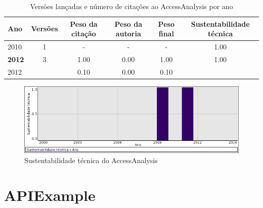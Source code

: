 \begin{table}[H]
\caption{Versões lançadas e número de citações ao AccessAnalysis por ano}
\centering
\begin{tabular}{| l | c | c | c | c | c |}
  \hline
  Ano & Versões & Peso da citação & Peso da autoria & Peso final & Sustentabilidade técnica \\
  \hline
        2010 & 1 & - & - & -
        &
          {\color{blue} 1.00}
        \\
\hline
            {\bf 2012}
          &
          3
          &
          1.00
          &
          0.00
          &
          1.00
          &
            {\color{blue} 1.00}
          \\
            2012
          &
          
          &
          0.10
          &
          0.00
          &
          0.10
          &
          \\
\hline
\end{tabular}
\end{table}

\begin{figure}[h]
  \center
  \includegraphics[scale=0.50]{imagens/softwares-charts/accessanalysis.png}
  \caption{Sustentabilidade técnica do AccessAnalysis}
\end{figure}


\section{APIExample}


